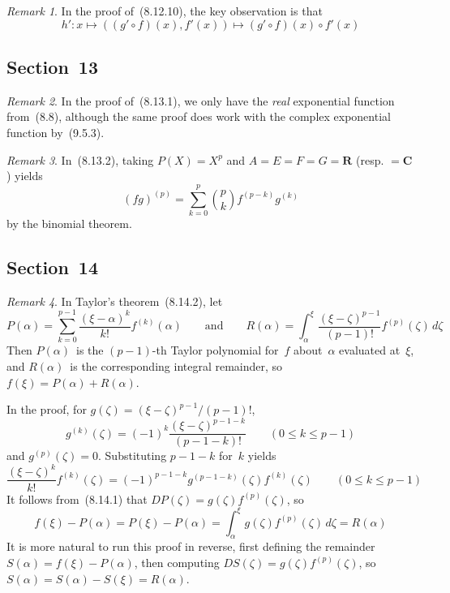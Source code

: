 \documentclass[letterpaper,12pt]{article}
\newcommand{\R}{\mathbf{R}}
\newcommand{\C}{\mathbf{C}}
\newcommand{\after}{\circ}
\newcommand{\dzeta}{\,d\zeta}
\theoremstyle{plain}
\theoremstyle{definition}
\theoremstyle{remark}
\newtheorem*{rmk}{Remark}
\begin{document}
\begin{rmk}
In the proof of~(8.12.10), the key observation is that
\[h':x\mapsto ((g'\after f)(x),f'(x))\mapsto (g'\after f)(x)\after f'(x)\]
\end{rmk}

\subsection*{Section~13}
\begin{rmk}
In the proof of~(8.13.1), we only have the \emph{real} exponential function from~(8.8), although the same proof does work with the complex exponential function by~(9.5.3).
\end{rmk}

\begin{rmk}
In~(8.13.2), taking \(P(X)=X^p\) and \(A=E=F=G=\R\) (resp. \(=\C\)) yields
\[(fg)^{(p)}=\sum_{k=0}^p\binom{p}{k}f^{(p-k)}g^{(k)}\]
by the binomial theorem.
\end{rmk}

\subsection*{Section~14}
\begin{rmk}
In Taylor's theorem~(8.14.2), let
\[P(\alpha)=\sum_{k=0}^{p-1}\frac{(\xi-\alpha)^k}{k!}f^{(k)}(\alpha)\qquad\text{and}\qquad R(\alpha)=\int_{\alpha}^{\xi}\frac{(\xi-\zeta)^{p-1}}{(p-1)!}f^{(p)}(\zeta)\dzeta\]
Then \(P(\alpha)\)~is the \((p-1)\)-th Taylor polynomial for~\(f\) about~\(\alpha\) evaluated at~\(\xi\), and \(R(\alpha)\)~is the corresponding integral remainder, so \(f(\xi)=P(\alpha)+R(\alpha)\).

In the proof, for \(g(\zeta)=(\xi-\zeta)^{p-1}/(p-1)!\),
\[g^{(k)}(\zeta)=(-1)^k\frac{(\xi-\zeta)^{p-1-k}}{(p-1-k)!}\qquad(0\le k\le p-1)\]
and \(g^{(p)}(\zeta)=0\). Substituting \(p-1-k\) for~\(k\) yields
\[\frac{(\xi-\zeta)^k}{k!}f^{(k)}(\zeta)=(-1)^{p-1-k}g^{(p-1-k)}(\zeta)f^{(k)}(\zeta)\qquad(0\le k\le p-1)\]
It follows from~(8.14.1) that \(DP(\zeta)=g(\zeta)f^{(p)}(\zeta)\), so
\[f(\xi)-P(\alpha)=P(\xi)-P(\alpha)=\int_{\alpha}^{\xi}g(\zeta)f^{(p)}(\zeta)\dzeta=R(\alpha)\]
It is more natural to run this proof in reverse, first defining the remainder \(S(\alpha)=f(\xi)-P(\alpha)\), then computing \(DS(\zeta)=g(\zeta)f^{(p)}(\zeta)\), so \(S(\alpha)=S(\alpha)-S(\xi)=R(\alpha)\).
\end{rmk}
\end{document}
